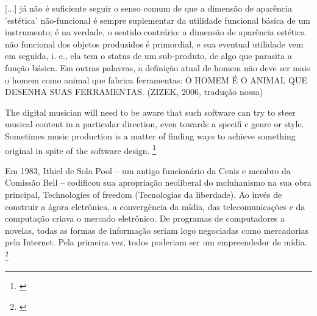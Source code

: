 [...] já não é suficiente seguir o senso comum de que a dimensão de aparência 'estética' não-funcional é sempre suplementar da utilidade funcional básica de um instrumento; é na verdade, o sentido contrário: a dimensão de aparência estética não funcional dos objetos produzidos é primordial, e sua eventual utilidade vem em seguida, i. e., ela tem o status de um sub-produto, de algo que parasita a função básica. Em outras palavras, a definição atual de homem não deve ser mais o homem como animal que fabrica ferramentas: O HOMEM É O ANIMAL QUE DESENHA SUAS FERRAMENTAS. (ZIZEK, 2006, tradução nossa)

The digital musician will need to be aware that such software can try to steer musical content in a particular direction, even towards a specifi c genre or style. Sometimes music production is a matter of finding ways to achieve something original in spite of the software design. \footnote{\cite[195]{Hugill2012}}






\begin{citacao}
Em 1983, Ithiel de Sola Pool – um antigo funcionário da Cenis e membro da Comissão Bell – codificou sua apropriação neoliberal do mcluhanismo na sua obra principal, Technologies of freedom (Tecnologias da liberdade). Ao invés de construir a ágora eletrônica, a convergência da mídia, das telecomunicações e da computação criava o mercado eletrônico. De programas de computadores a novelas, todas as formas de informação seriam logo negociadas como mercadorias pela Internet. Pela primeira vez, todos poderiam ser um empreendedor de mídia. \footnote{\cite[348]{Barbrook2009}}
\end{citacao}






    \newpage
